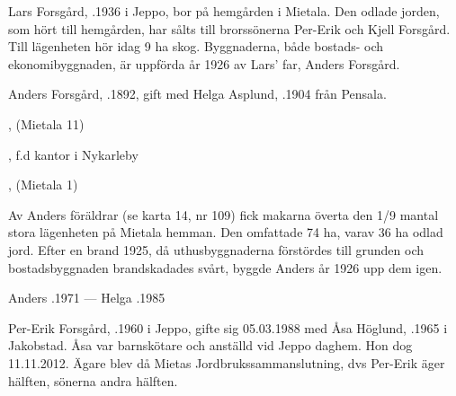


Lars Forsgård, .1936 i Jeppo, bor på hemgården i Mietala. Den odlade jorden, som hört till hemgården, har sålts till brorssönerna Per-Erik och Kjell Forsgård. Till lägenheten hör idag 9 ha skog. Byggnaderna, både bostads- och ekonomibyggnaden, är uppförda år 1926 av Lars' far, Anders Forsgård.


Anders Forsgård, .1892, gift med Helga Asplund, .1904 från Pensala.
\begin{jhchildren}
  \item {}, (Mietala 11)
  \item {}, f.d kantor i Nykarleby
  \item {}, (Mietala  1)
  \item {}
  \item {}
\end{jhchildren}

Av Anders föräldrar (se karta 14, nr 109) fick makarna överta den 1/9 mantal stora lägenheten på Mietala hemman. Den omfattade 74 ha, varav 36 ha odlad jord. Efter en brand 1925, då uthusbyggnaderna förstördes till grunden och  bostadsbyggnaden  brandskadades svårt, byggde Anders år 1926 upp dem igen.

Anders .1971  ---  Helga .1985








Per-Erik Forsgård, .1960 i Jeppo, gifte sig 05.03.1988 med Åsa Höglund, .1965 i Jakobstad. Åsa var barnskötare och anställd vid Jeppo daghem. Hon dog 11.11.2012. Ägare blev då Mietas Jordbrukssammanslutning, dvs Per-Erik äger hälften, sönerna andra hälften.
\begin{jhchildren}
  \item {}
  \item {}
\end{jhchildren}

